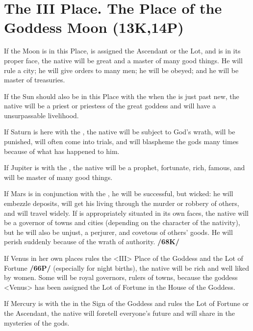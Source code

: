 \section{The III Place. The Place of the Goddess Moon (13K,14P)}

If the Moon is in this Place, is assigned the Ascendant or the Lot, and is in its proper face, the native will be great and a master of many good things. He will rule a city; he will give orders to many men; he will be obeyed; and he will be master of treasuries. 

If the Sun should also be in this Place with the \Moon\xspace when the \Moon\xspace is just past new, the native will be a priest or priestess of the great goddess and will have a unsurpassable livelihood. 

If Saturn is here with the \Moon, the native will be subject to God's wrath, will be punished, will often come into trials, and will blaspheme the gods many times because of what has happened to him. 

If Jupiter is with the \Moon, the native will be a prophet, fortunate, rich, famous, and will be master of many good things. 

If Mars is in conjunction with the \Moon, he will be successful, but wicked: he will embezzle deposits, will get his living through the murder or robbery of others, and will travel widely. If \Mars\xspace is appropriately situated in its own faces, the native will be a governor of towns and cities (depending on the character of the nativity), but he will also be unjust, a perjurer, and covetous of others’ goods. He will perish suddenly because of the wrath of authority. \textbf{/68K/} 

If Venus in her own places rules the <III> Place of the Goddess and the Lot of Fortune \textbf{/66P/} (especially for night births), the native will be rich and well liked by women. Some will be royal governors, rulers of towns, because the goddess <Venus> has been assigned the Lot of Fortune in the House of the Goddess. 

If Mercury is with the \Moon\xspace in the Sign of the Goddess and rules the Lot of Fortune or the Ascendant, the native will foretell everyone’s future and will share in the mysteries of the gods.

\newpage